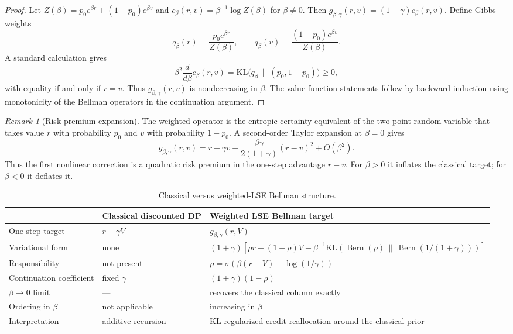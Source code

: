 \documentclass{article}
\theoremstyle{remark}
\newtheorem{remark}[remark]{Remark}
\DeclareMathOperator{\Bern}{Bern}
\newcommand{\KL}{\mathrm{KL}}
\newcommand{\gbg}{g_{\beta,\gamma}}
\newcommand{\pprior}{p_0}
\newcommand{\KLbin}[2]{\KL\!\left(\Bern(#1)\,\middle\|\,\Bern(#2)\right)}
\begin{document}
\begin{proof}
Let $Z(\beta)=\pprior e^{\beta r} + (1-\pprior)e^{\beta v}$ and $c_\beta(r,v)=\beta^{-1}\log Z(\beta)$ for $\beta\neq 0$.
Then $\gbg(r,v)=(1+\gamma)c_\beta(r,v)$.
Define Gibbs weights
\[
q_\beta(r)=\frac{\pprior e^{\beta r}}{Z(\beta)},
\qquad
q_\beta(v)=\frac{(1-\pprior)e^{\beta v}}{Z(\beta)}.
\]
A standard calculation gives
\[
\beta^2\frac{d}{d\beta}c_\beta(r,v)
= \KL\bigl(q_\beta\,\|\,(\pprior,1-\pprior)\bigr) \ge 0,
\]
with equality if and only if $r=v$.
Thus $\gbg(r,v)$ is nondecreasing in $\beta$.
The value-function statements follow by backward induction using monotonicity of the Bellman operators in the continuation argument.
\end{proof}

\begin{remark}[Risk-premium expansion]
\label{rem:risk-premium}
The weighted operator is the entropic certainty equivalent of the two-point random variable that takes value $r$ with probability $\pprior$ and $v$ with probability $1-\pprior$.
A second-order Taylor expansion at $\beta=0$ gives
\begin{equation}
\gbg(r,v)=r+\gamma v + \frac{\beta\gamma}{2(1+\gamma)}(r-v)^2 + O(\beta^2).
\label{eq:risk-premium}
\end{equation}
Thus the first nonlinear correction is a quadratic risk premium in the one-step advantage $r-v$.
For $\beta>0$ it inflates the classical target; for $\beta<0$ it deflates it.
\end{remark}

\begin{table}[t]
\centering
\small
\caption{Classical versus weighted-LSE Bellman structure.}
\label{tab:bellman-comparison}
\begin{tabularx}{\textwidth}{@{}>{\raggedright\arraybackslash}p{}XX@{}}
\toprule
 & Classical discounted DP & Weighted LSE Bellman target \\
\midrule
One-step target & $r+\gamma V$ & $\gbg(r,V)$ \\
Variational form & none & $(1+\gamma)[\rho r +(1-\rho)V - \beta^{-1}\KLbin{\rho}{1/(1+\gamma)}]$ \\
Responsibility & not present & $\rho=\sigma(\beta(r-V)+\log(1/\gamma))$ \\
Continuation coefficient & fixed $\gamma$ & $(1+\gamma)(1-\rho)$ \\
$\beta\to 0$ limit & --- & recovers the classical column exactly \\
Ordering in $\beta$ & not applicable & increasing in $\beta$ \\
Interpretation & additive recursion & KL-regularized credit reallocation around the classical prior \\
\bottomrule
\end{tabularx}
\end{table}
\end{document}
